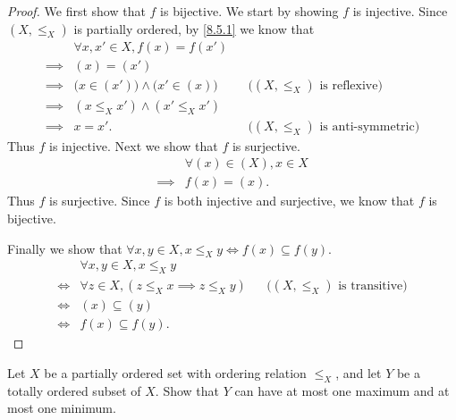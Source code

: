 \begin{proof}
  We first show that \(f\) is bijective.
  We start by showing \(f\) is injective.
  Since \((X, \leq_X)\) is partially ordered, by \cref{8.5.1} we know that
  \begin{align*}
             & \forall x, x' \in X, f(x) = f(x')                                                               \\
    \implies & (x) = (x')                                                                                      \\
    \implies & \big(x \in (x')\big) \land \big(x' \in (x)\big) &  & \text{(\((X, \leq_X)\) is reflexive)}      \\
    \implies & (x \leq_X x') \land (x' \leq_X x')                                                              \\
    \implies & x = x'.                                         &  & \text{(\((X, \leq_X)\) is anti-symmetric)}
  \end{align*}
  Thus \(f\) is injective.
  Next we show that \(f\) is surjective.
  \begin{align*}
             & \forall (x) \in (X), x \in X \\
    \implies & f(x) = (x).
  \end{align*}
  Thus \(f\) is surjective.
  Since \(f\) is both injective and surjective, we know that \(f\) is bijective.

  Finally we show that \(\forall x, y \in X, x \leq_X y \iff f(x) \subseteq f(y)\).
  \begin{align*}
         & \forall x, y \in X, x \leq_X y                                                                \\
    \iff & \forall z \in X, (z \leq_X x \implies z \leq_X y) &  & \text{(\((X, \leq_X)\) is transitive)} \\
    \iff & (x) \subseteq (y)                                                                             \\
    \iff & f(x) \subseteq f(y).
  \end{align*}
\end{proof}

\begin{ex}\label{ex:8.5.7}
  Let \(X\) be a partially ordered set with ordering relation \(\leq_X\), and let \(Y\) be a totally ordered subset of \(X\).
  Show that \(Y\) can have at most one maximum and at most one minimum.
\end{ex}

